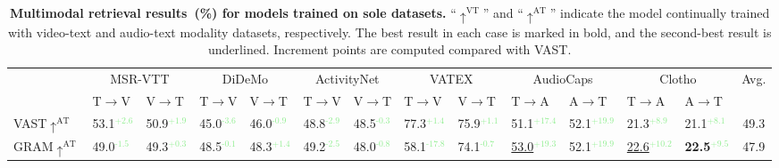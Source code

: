\begin{table}[t]
\centering
\caption{\textbf{Multimodal retrieval results~(\%) for models trained on sole datasets.} ``$\uparrow^{\text{VT}}$'' and ``$\uparrow^{\text{AT}}$'' indicate the model continually trained with video-text and audio-text modality datasets, respectively. The best result in each case is marked in bold, and the second-best result is underlined. Increment points are computed compared with VAST. }
\vspace{-2mm}
\label{tab:sole_datasets}
\begin{adjustbox}{width=\textwidth,center}
\begin{tabular}{@{}l|ll|ll|ll|ll|ll|ll|c@{}}
\toprule
 & \multicolumn{2}{c|}{MSR-VTT} & \multicolumn{2}{c|}{DiDeMo} & \multicolumn{2}{c|}{ActivityNet}  & \multicolumn{2}{c|}{VATEX}   & \multicolumn{2}{c|}{AudioCaps}  & \multicolumn{2}{c}{Clotho} & Avg.  \\  & T$\rightarrow$V    & V$\rightarrow$T   & T$\rightarrow$V     & V$\rightarrow$T  & T$\rightarrow$V    & V$\rightarrow$T  & T$\rightarrow$V    & V$\rightarrow$T  & T$\rightarrow$A    & A$\rightarrow$T   & T$\rightarrow$A    & A$\rightarrow$T    \\ \midrule
VAST$\uparrow^{\text{AT}}$ & 53.1\textcolor{lightgreen}{$^\text{+2.6}$}            & 50.9\textcolor{lightgreen}{$^\text{+1.9}$}            & 45.0\textcolor{lightgreen}{$^\text{-3.6}$}           & 46.0\textcolor{lightgreen}{$^\text{-0.9}$}           & 48.8\textcolor{lightgreen}{$^\text{-2.9}$}           & 48.5\textcolor{lightgreen}{$^\text{-0.3}$}           & 77.3\textcolor{lightgreen}{$^\text{+1.4}$}           & 75.9\textcolor{lightgreen}{$^\text{+1.1}$}           & 51.1\textcolor{lightgreen}{$^\text{+17.4}$}           & 52.1\textcolor{lightgreen}{$^\text{+19.9}$}           & 21.3\textcolor{lightgreen}{$^\text{+8.9}$}           & 21.1\textcolor{lightgreen}{$^\text{+8.1}$}       & 49.3    \\
GRAM$\uparrow^{\text{AT}}$   & 49.0\textcolor{lightgreen}{$^\text{-1.5}$}           & 49.3\textcolor{lightgreen}{$^\text{+0.3}$}           & 48.5\textcolor{lightgreen}{$^\text{-0.1}$}           & 48.3\textcolor{lightgreen}{$^\text{+1.4}$}           & 49.2\textcolor{lightgreen}{$^\text{-2.5}$}           & 48.0\textcolor{lightgreen}{$^\text{-0.8}$}           & 58.1\textcolor{lightgreen}{$^\text{-17.8}$}          & 74.1\textcolor{lightgreen}{$^\text{-0.7}$}           & \underline{53.0}\textcolor{lightgreen}{$^\text{+19.3}$}          & 52.1\textcolor{lightgreen}{$^\text{+19.9}$}          & \underline{22.6}\textcolor{lightgreen}{$^\text{+10.2}$}          & \textbf{22.5\textcolor{lightgreen}{$^\text{+9.5}$}}    & 47.9       \\

\end{tabular}
\end{adjustbox}
\end{table}
